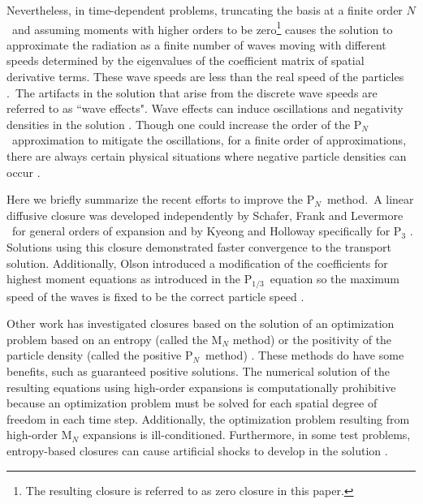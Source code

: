 \documentclass[review]{elsarticle}
\newcommand{\pn}{P$_N$}
\begin{document}
Nevertheless, in time-dependent problems, truncating the basis at a finite order $N$\ and assuming moments with higher orders to be zero\footnote{The resulting closure is referred to as zero closure in this paper.} causes the solution  to approximate the radiation as a finite number of waves moving with different speeds determined by the eigenvalues of the coefficient matrix of spatial derivative terms. These wave speeds are less than the real speed of the particles \cite{brunner_app_rad_trans,mccfpn09,McClarren:2008cq}.\ The artifacts in the solution that arise from the discrete wave speeds are referred to as ``wave effects". Wave effects can induce oscillations and negativity densities in the solution \cite{mccfpn09,coryentropy}. Though one could increase the order of the  \pn\ approximation to mitigate the oscillations, for a finite order of approximations, there are always certain physical situations where negative particle densities can occur \cite{McClarren:2008hu,mccdissertation}.

Here we briefly summarize the recent efforts to improve the \pn~method.\ A linear diffusive closure was developed independently by Schafer, Frank and Levermore \cite{levermoredn}\ for general orders of expansion and by Kyeong and Holloway specifically for P$_3$ \cite{p3qs}. Solutions using this closure demonstrated faster convergence to the transport solution. Additionally, Olson introduced a modification of the coefficients for highest moment equations as introduced in the P$_{1/3}$\ equation so the maximum speed of the waves is fixed to be the correct particle speed \cite{Olson:2000vq}. %

Other work has investigated closures based on the solution of an optimization problem based on an entropy (called the M$_N$ method) \cite{cory_hauck_closures,brunnerentropy} or the positivity of the particle density (called the positive \pn~method) \cite{ppn}. These methods do have some benefits, such as guaranteed positive solutions. The numerical solution of the resulting equations using high-order expansions is computationally prohibitive because an optimization problem must be solved for each spatial degree of freedom in each time step. Additionally, the optimization problem resulting from high-order M$_N$ expansions is ill-conditioned. Furthermore, in some test problems, entropy-based closures can cause artificial  shocks to develop in the solution  \cite{cory_hauck_closures,brunnerentropy}. 
\end{document}
